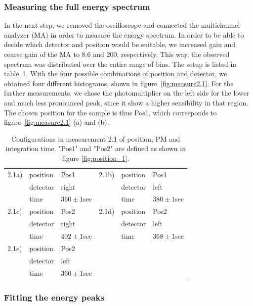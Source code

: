 \subsubsection{Measuring the full energy spectrum}
\label{ssub:Measuring the full energy spectrum}
In the next step, we removed the oscilloscope and connected the multichannel analyzer (MA)
in order to measure the energy spectrum. In order to be able to decide which detector and position would
be suitable, we increased gain and coarse gain of the MA to 8.6 and 200, respectively.
This way, the observed spectrum was distributed over the entire range of bins. 
The setup is listed in table~\ref{tab:config2}. With the four possible combinations
of position and detector, we obtained four different histograms, shown in figure~\ref{fig:measure2.1}.
For the further measurements, we chose the photomultiplier on the left side for the lower and much less 
pronounced peak, since it show a higher sensibility in that region. The 
chosen position for the sample is thus Pos1, which corresponds to figure~\ref{fig:measure2.1} (a) and (b).
\begin{table}[htp]
    \begin{tabular}{|l|l|l||l|l|l|}
        \hline
        2.1a) & position  & Pos1         & 2.1b) & position  & Pos1\\
              & detector          & right        &       & detector          & left \\
              & time        & $360\pm1$sec &       & time        & $380\pm1$sec \\
        \hline 
        2.1c) & position  & Pos2         & 2.1d) & position  & Pos2         \\
              & detector          & right        &       & detector          & left \\
              & time        & $402\pm1$sec &       & time        & $368\pm1$sec \\
        \hline 
        2.1e) & position  & Pos2         \\
              & detector          & left \\
              & time        & $360\pm1$sec \\
    \cline{1-3}
    \end{tabular}
    \caption{
        Configurations in measurement 2.1 of position, PM and integration time. 
        "Pos1" and "Pos2" are defined as shown in figure \ref{fig:position_1}. 
        }
    \label{tab:config2}
\end{table}
\subsubsection{Fitting the energy peaks}

